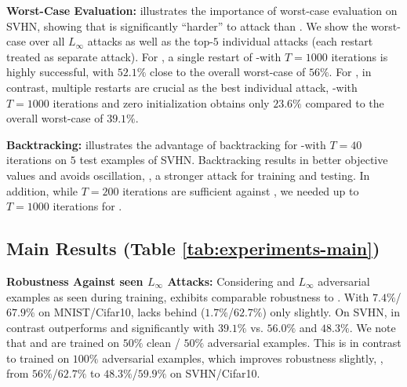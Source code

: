 \textbf{Worst-Case Evaluation:} 
%
 illustrates the importance of worst-case evaluation on SVHN, showing that \ConfTrain is significantly ``harder'' to attack than \AdvTrain. We show the worst-case \RTE over all $L_\infty$ attacks as well as the top-$5$ individual attacks (each restart treated as separate attack). For \AdvTrainHalf, a single restart of \PGD-\FConf with $T=1000$ iterations is highly successful, with $52.1\%$ \RTE close to the overall worst-case of $56\%$. For \ConfTrain, in contrast, multiple restarts are crucial as the best individual attack, \PGD-\FConf with $T=1000$ iterations and zero initialization obtains only $23.6\%$ \RTE compared to the overall worst-case of $39.1\%$.

\textbf{Backtracking:}
%
 illustrates the advantage of backtracking for \PGD-\FConf with $T{=}40$ iterations on $5$ test examples of SVHN. Backtracking results in better objective values and avoids oscillation, \ie, a stronger attack for training and testing. In addition, while $T{=}200$ iterations are sufficient against \AdvTrain, we needed up to $T{=}1000$ iterations for \ConfTrain.

\subsection{Main Results (Table  \ref{tab:experiments-main})}
\label{subsec:experiments-main}

\textbf{Robustness Against \textcolor{colorbrewer3}{seen} $L_\infty$ Attacks:}
%
Considering  and $L_\infty$ adversarial examples as \textcolor{colorbrewer3}{seen} during training, \ConfTrain exhibits comparable robustness to \AdvTrain. With $7.4\%$/$67.9\%$ \RTE on MNIST/Cifar10, \ConfTrain lacks behind \AdvTrainHalf ($1.7\%$/$62.7\%$) only slightly. On SVHN, in contrast \ConfTrain outperforms \AdvTrainHalf and \AdvTrainFull significantly with $39.1\%$ vs. $56.0\%$ and $48.3\%$. We note that \ConfTrain and \AdvTrainHalf are trained on $50\%$ clean / $50\%$ adversarial examples. This is in contrast to \AdvTrainFull trained on $100\%$ adversarial examples, which improves robustness slightly, \eg, from $56\%$/$62.7\%$ to $48.3\%$/$59.9\%$ on SVHN/Cifar10.

